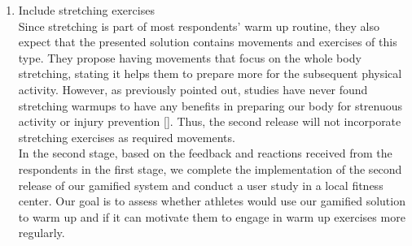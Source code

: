 \begin{enumerate}
\begin{enumerate}
\item Include stretching exercises\\
Since stretching is part of most respondents' warm up routine, they also expect that the presented solution contains movements and exercises of this type. They propose having movements that focus on the whole body stretching, stating it helps them to prepare more for the subsequent physical activity. However, as previously pointed out, studies have never found stretching warmups to have any benefits in preparing our body for strenuous activity or injury prevention []. Thus, the second release will not incorporate stretching exercises as required movements. \\In the second stage, based on the feedback and reactions received from the respondents in the first stage, we complete the implementation of the second release of our gamified system and conduct a user study in a local fitness center. Our goal is to assess whether athletes would use our gamified solution to warm up and if it can motivate them to engage in warm up exercises more regularly.
\end{enumerate}
\end{enumerate}



